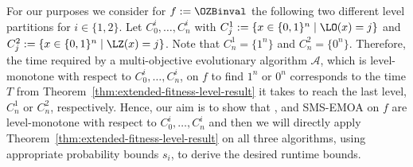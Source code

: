 {For our purposes we consider for $f:=\OZBinval$ the following two different level partitions for $i \in \{1,2\}$. Let $C_0^i, \ldots ,C_n^i$ with $C_j^1:=\{x \in \{0,1\}^n \mid \LO(x)=j\}$ and $C_j^2:=\{x \in \{0,1\}^n \mid \LZ(x)=j\}$. Note that $C_{n}^1=\{1^n\}$ and $C_{n}^2=\{0^n\}$. Therefore, the time required by a multi-objective evolutionary algorithm $\mathcal{A}$, which is level-monotone with respect to $C_0^i, \ldots , C_n^i$, on $f$ to find $1^n$ or $0^n$ corresponds to the time $T$ from Theorem~\ref{thm:extended-fitness-level-result} it takes to reach the last level, $C_n^1$ or $C_n^2$, respectively.
Hence, our aim is to show that \nsga, \nsgaiii and SMS-EMOA on $f$ are level-monotone with respect to $C_0^i, \ldots ,C_n^i$ and then we will directly apply Theorem~\ref{thm:extended-fitness-level-result} on all three algorithms, using appropriate probability bounds $s_i$, to derive the desired runtime bounds.}

